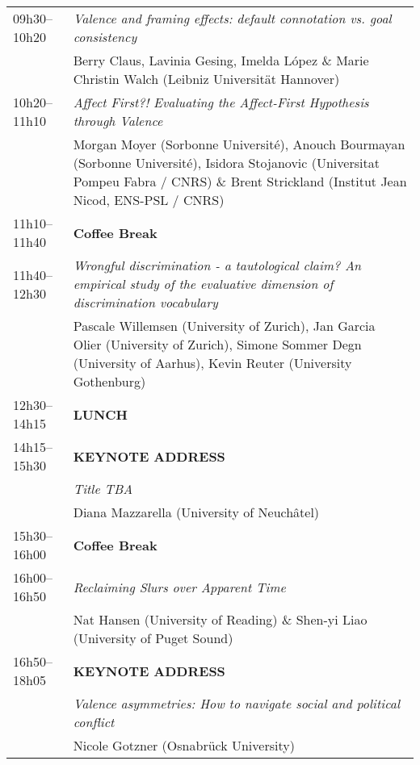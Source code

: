 \documentclass[a4paper,12pt]{article}
\begin{document}
\begin{center}
\begin{tabularx}{\textwidth}{>{\raggedright\arraybackslash}p{3cm} X}
\hline
09h30--10h20 & \textit{Valence and framing effects: default connotation vs. goal consistency} \\
            & Berry Claus, Lavinia Gesing, Imelda López \& Marie Christin Walch (Leibniz Universität Hannover) \\
\hline
10h20--11h10 & \textit{Affect First?! Evaluating the Affect-First Hypothesis through Valence} \\
             & Morgan Moyer (Sorbonne Université), Anouch Bourmayan (Sorbonne Université), Isidora Stojanovic (Universitat Pompeu Fabra / CNRS) \& Brent Strickland (Institut Jean Nicod, ENS-PSL / CNRS) \\
\hline
11h10--11h40 & \textbf{Coffee Break} \\
\hline
11h40--12h30 & \textit{Wrongful discrimination - a tautological claim? An empirical study of the evaluative dimension of discrimination vocabulary} \\
             & Pascale Willemsen (University of Zurich), Jan Garcia Olier (University of Zurich), Simone Sommer Degn (University of Aarhus), Kevin Reuter (University Gothenburg) \\
\hline
12h30--14h15 & \textbf{LUNCH} \\
\hline
14h15--15h30 & \textbf{KEYNOTE ADDRESS} \\
             & \textit{Title TBA} \\
             & Diana Mazzarella (University of Neuchâtel) \\
\hline
15h30--16h00 & \textbf{Coffee Break} \\
\hline
16h00--16h50 & \textit{Reclaiming Slurs over Apparent Time} \\
             & Nat Hansen (University of Reading) \& Shen-yi Liao (University of Puget Sound) \\
\hline
16h50--18h05 & \textbf{KEYNOTE ADDRESS} \\
             & \textit{Valence asymmetries: How to navigate social and political conflict} \\
             & Nicole Gotzner (Osnabrück University) \\
\hline 
\end{tabularx}
\end{center}
\end{document}

